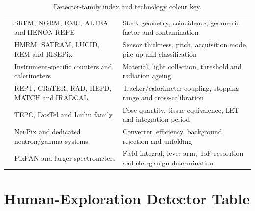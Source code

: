 
\begin{table}[htbp]
\centering\small
\caption{Detector-family index and technology colour key.}
\label{tab:family-index}
\ReportTableRows
\begin{tabularx}{\textwidth}{p{3.5cm}Y Y}
\toprule
{}
 &  &
\\
\midrule
{} & SREM, NGRM, EMU, ALTEA and HENON REPE & Stack geometry, coincidence, geometric factor and contamination\\
 & HMRM, SATRAM, LUCID, REM and RISEPix & Sensor thickness, pitch, acquisition mode, pile-up and classification\\
 & Instrument-specific counters and calorimeters & Material, light collection, threshold and radiation ageing\\
 & REPT, CRaTER, RAD, HEPD, MATCH and IRADCAL & Tracker/calorimeter coupling, stopping range and cross-calibration\\
 & TEPC, DosTel and Liulin family & Dose quantity, tissue equivalence, LET and integration period\\
 & NeuPix and dedicated neutron/gamma systems & Converter, efficiency, background rejection and unfolding\\
 & PixPAN and larger spectrometers & Field integral, lever arm, ToF resolution and charge-sign determination\\
\bottomrule
\end{tabularx}
\StopReportTableRows
\end{table}

\section{Human-Exploration Detector Table}
\label{app:human-exploration}

